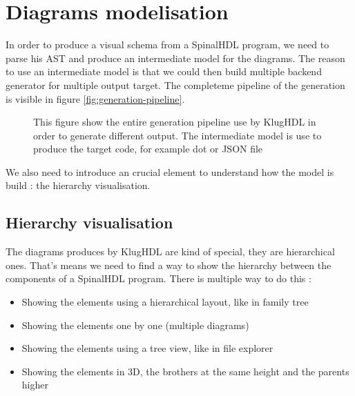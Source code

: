 \chapter{Diagrams modelisation}

In order to produce a visual schema from a SpinalHDL program, we need to parse his AST and produce an intermediate model for the diagrams. The reason to use an intermediate model is that we could then build multiple backend generator for multiple output target. The completeme pipeline of the generation is visible in figure \ref{fig:generation-pipeline}.

\begin{figure}[h] %
    \centering
    \caption[KlugHDL generation pipeline]{This figure show the entire generation pipeline use by KlugHDL in order to generate different output. The intermediate model is use to produce the target code, for example dot or JSON file}
    \label{private def generateComponent(diagram : Diagram) : Model = {
    // add all the children of the parent to the diagrams
    diagram.foreachChildren(diagram.addComponents, topLevel)
    // add the input and output parent connection, except it's top level
    if (diagram.parent != null)
      diagram.addIoComponents(diagram.parent)
    this
  }}
\end{figure} %

We also need to introduce an crucial element to understand how the model is build : the hierarchy visualisation.

\section{Hierarchy visualisation}

The diagrams produces by KlugHDL are kind of special, they are hierarchical ones. That's means we need to find a way to show the hierarchy between the components of a SpinalHDL program. There is multiple way to do this :
\begin{itemize}
  \item Showing the elements using a hierarchical layout, like in family tree
  \item Showing the elements one by one (multiple diagrams)
  \item Showing the elements using a tree view, like in file explorer
  \item Showing the elements in 3D, the brothers at the same height and the parents higher
\end{itemize}

